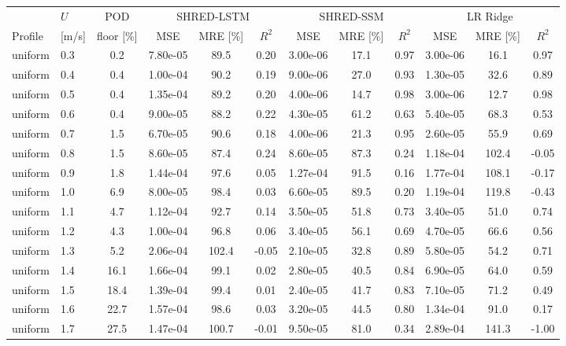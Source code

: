 \begin{table}[h!]
\centering\small\setlength{\tabcolsep}{3pt}
\begin{tabular}{ll c ccc ccc ccc}
\toprule
 & $U$ & POD & \multicolumn{3}{c}{SHRED-LSTM} & \multicolumn{3}{c}{SHRED-SSM} & \multicolumn{3}{c}{LR Ridge} \\
\cmidrule(lr){4-6}\cmidrule(lr){7-9}\cmidrule(lr){10-12}
Profile & [m/s] & floor [\%] & MSE & MRE [\%] & $R^{2}$ & MSE & MRE [\%] & $R^{2}$ & MSE & MRE [\%] & $R^{2}$ \\
\midrule
uniform & 0.3 & 0.2 & 7.80e-05 & 89.5 & 0.20 & 3.00e-06 & 17.1 & 0.97 & 3.00e-06 & 16.1 & 0.97 \\
uniform & 0.4 & 0.4 & 1.00e-04 & 90.2 & 0.19 & 9.00e-06 & 27.0 & 0.93 & 1.30e-05 & 32.6 & 0.89 \\
uniform & 0.5 & 0.4 & 1.35e-04 & 89.2 & 0.20 & 4.00e-06 & 14.7 & 0.98 & 3.00e-06 & 12.7 & 0.98 \\
uniform & 0.6 & 0.4 & 9.00e-05 & 88.2 & 0.22 & 4.30e-05 & 61.2 & 0.63 & 5.40e-05 & 68.3 & 0.53 \\
uniform & 0.7 & 1.5 & 6.70e-05 & 90.6 & 0.18 & 4.00e-06 & 21.3 & 0.95 & 2.60e-05 & 55.9 & 0.69 \\
uniform & 0.8 & 1.5 & 8.60e-05 & 87.4 & 0.24 & 8.60e-05 & 87.3 & 0.24 & 1.18e-04 & 102.4 & -0.05 \\
uniform & 0.9 & 1.8 & 1.44e-04 & 97.6 & 0.05 & 1.27e-04 & 91.5 & 0.16 & 1.77e-04 & 108.1 & -0.17 \\
uniform & 1.0 & 6.9 & 8.00e-05 & 98.4 & 0.03 & 6.60e-05 & 89.5 & 0.20 & 1.19e-04 & 119.8 & -0.43 \\
uniform & 1.1 & 4.7 & 1.12e-04 & 92.7 & 0.14 & 3.50e-05 & 51.8 & 0.73 & 3.40e-05 & 51.0 & 0.74 \\
uniform & 1.2 & 4.3 & 1.00e-04 & 96.8 & 0.06 & 3.40e-05 & 56.1 & 0.69 & 4.70e-05 & 66.6 & 0.56 \\
uniform & 1.3 & 5.2 & 2.06e-04 & 102.4 & -0.05 & 2.10e-05 & 32.8 & 0.89 & 5.80e-05 & 54.2 & 0.71 \\
uniform & 1.4 & 16.1 & 1.66e-04 & 99.1 & 0.02 & 2.80e-05 & 40.5 & 0.84 & 6.90e-05 & 64.0 & 0.59 \\
uniform & 1.5 & 18.4 & 1.39e-04 & 99.4 & 0.01 & 2.40e-05 & 41.7 & 0.83 & 7.10e-05 & 71.2 & 0.49 \\
uniform & 1.6 & 22.7 & 1.57e-04 & 98.6 & 0.03 & 3.20e-05 & 44.5 & 0.80 & 1.34e-04 & 91.0 & 0.17 \\
uniform & 1.7 & 27.5 & 1.47e-04 & 100.7 & -0.01 & 9.50e-05 & 81.0 & 0.34 & 2.89e-04 & 141.3 & -1.00 \\

\end{tabular}
\end{table}
